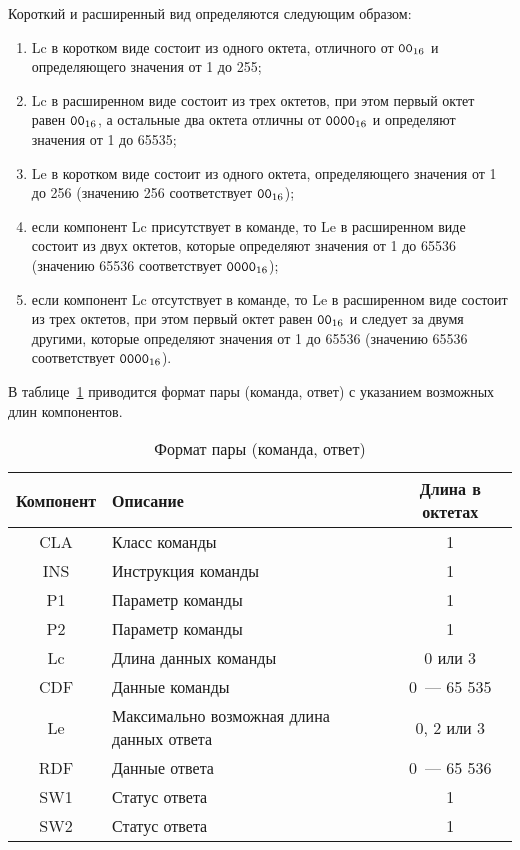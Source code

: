 Короткий и расширенный вид определяются следующим образом: 
\begin{enumerate}
\item[1)]
Lc в коротком виде состоит из одного октета, отличного от $\texttt{00}_{16}$ и 
определяющего значения от 1 до 255; 

\item[2)] 
Lc в расширенном виде состоит из трех октетов, при этом первый октет 
равен $\texttt{00}_{16}$, а остальные два октета отличны от 
$\texttt{0000}_{16}$ и определяют значения от 1 до 65535; 

\item[3)] 
Le в коротком виде состоит из одного октета, определяющего значения 
от 1 до 256 (значению 256 соответствует $\texttt{00}_{16}$); 

\item[4)] 
если компонент Lc присутствует в команде, то Le в расширенном виде 
состоит из двух октетов, которые определяют значения от 1 до 65536 
(значению 65536 соответствует $\texttt{0000}_{16}$); 

\item[5)] 
если компонент Lc отсутствует в команде, то Le в расширенном виде 
состоит из трех октетов, при этом первый октет равен $\texttt{00}_{16}$ и 
следует за двумя другими, которые определяют значения от 1 до 65536 
(значению 65536 соответствует $\texttt{0000}_{16}$). 
\end{enumerate}

В таблице~\ref{Table.CMDS.Fmt} приводится формат пары (команда, ответ) 
с указанием возможных длин компонентов.

\begin{table}[h]
\caption{Формат пары (команда, ответ)}\label{Table.CMDS.Fmt}
\begin{tabular}{|c|p{10.5cm}|c|}
\hline
Компонент & Описание & Длина в октетах \\
\hline
\hline
CLA & Класс команды & 1 \\
\hline
INS & Инструкция команды & 1 \\
\hline
P1 & Параметр команды & 1 \\
\hline
P2 & Параметр команды & 1 \\
\hline
Lc & Длина данных команды & 0 или 3  \\
\hline
CDF & Данные команды & 0~--- 65 535 \\
\hline
Le & Максимально возможная длина данных ответа & 0, 2 или 3 
\\
\hline
RDF & Данные ответа & 0~--- 65 536 \\
\hline
SW1 & Статус ответа & 1 \\
\hline
SW2 & Статус ответа & 1 \\
\hline
\end{tabular}
\end{table}

